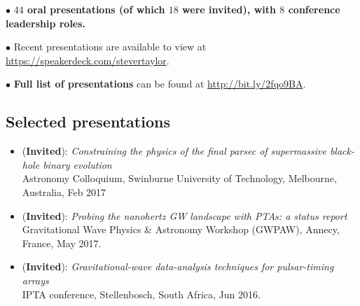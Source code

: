 \documentclass[11pt,letterpaper,sans]{moderncv}
\begin{document}
$\bullet$ \textbf{$44$ oral presentations (of which $18$ were invited), with $8$ conference leadership roles.}

$\bullet$ Recent presentations are available to view at {\color{color1} \href{https://speakerdeck.com/stevertaylor}{https://speakerdeck.com/stevertaylor}}.

$\bullet$ \textbf{Full list of presentations} can be found at {\color{color1} \href{http://bit.ly/2fqo9BA}{http://bit.ly/2fqo9BA}}.

\subsection{Selected presentations}

\begin{itemize}[leftmargin=8mm]

\item (\textbf{Invited}): \textit{Constraining the physics of the final parsec of supermassive black-hole binary evolution} \\ Astronomy Colloquium, Swinburne University of Technology, Melbourne, Australia, Feb 2017

\item (\textbf{Invited}): \textit{Probing the nanohertz GW landscape with PTAs: a status report} \\ Gravitational Wave Physics \& Astronomy Workshop (GWPAW), Annecy, France, May 2017.

\item (\textbf{Invited}): \textit{Gravitational-wave data-analysis techniques for pulsar-timing arrays} \\ IPTA conference, Stellenbosch, South Africa, Jun 2016.

\end{itemize}
\end{document}
